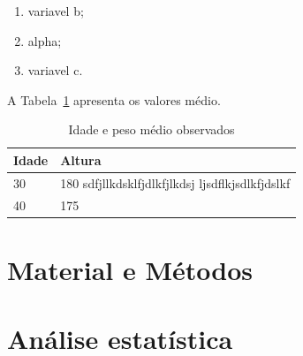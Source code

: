 \documentclass[a4paper, brazil, 12pt , onecolumn]{report}
\begin{document}
\begin{enumerate}
	\item variavel b;
	\item alpha;
	\item variavel c.
\end{enumerate}
A Tabela~\ref{tab:idade} apresenta os valores médio.
\begin{table}[htb]
	\caption{Idade e peso médio observados}\label{tab:idade}
	\centering
	
	\begin{tabularx}{0.9\linewidth}{lX}
		\hline
		\bf Idade & \bf Altura \\ 
		\hline
		30 & 180 sdfjllkdsklfjdlkfjlkdsj ljsdflkjsdlkfjdslkf\\
		40 & 175 \\
		\hline
		\end{tabularx}
\end{table}
\chapter{Material e Métodos}\label{sec:mat}
\lipsum[3-8]
\lstset{language=Python}




\printindex
\appendix
\chapter{Análise estatística}
\lipsum[3-5]


\end{document}
